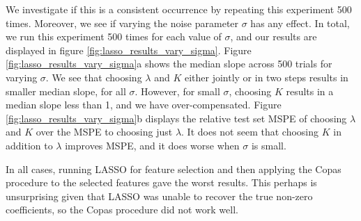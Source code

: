 \documentclass[main]{subfiles}
\begin{document}
 \par
We investigate if this is a consistent occurrence by repeating this experiment 500 times. Moreover, we see if varying the
noise parameter $\sigma$ has any effect. In total, we run this experiment 500 times for each value of $\sigma$, and our results are
displayed in figure \ref{fig:lasso_results_vary_sigma}. Figure \ref{fig:lasso_results_vary_sigma}a shows the median slope across
500 trials for varying $\sigma$. We see that choosing $\lambda$ and $K$ either jointly or in two steps results in smaller median
slope,
for all $\sigma$. However, for small $\sigma$, choosing $K$ results in a median slope less than 1,
and we have over-compensated. Figure
\ref{fig:lasso_results_vary_sigma}b displays the relative test set MSPE of choosing $\lambda$ and $K$ over
the MSPE to choosing just $\lambda$. It does not seem that choosing $K$ in addition to $\lambda$ improves MSPE,
and it does worse when $\sigma$ is small.

In all cases, running LASSO for feature selection and then applying the Copas procedure to the selected features gave the
worst results. This perhaps is unsurprising given that LASSO was unable to recover the true non-zero coefficients, so the
Copas procedure did not work well.
\end{document}
